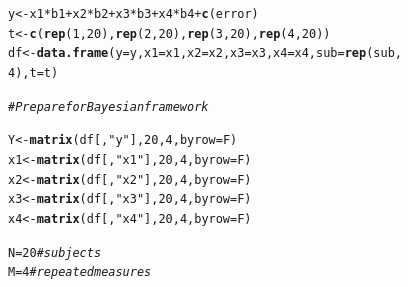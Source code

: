 \documentclass[11pt,a4paper,twoside]{book}\usepackage[]{graphicx}\usepackage[]{color}
\makeatletter
\newcommand{\hlnum}[1]{\textcolor[rgb]{0.686,0.059,0.569}{#1}}%
\newcommand{\hlstr}[1]{\textcolor[rgb]{0.192,0.494,0.8}{#1}}%
\newcommand{\hlcom}[1]{\textcolor[rgb]{0.678,0.584,0.686}{\textit{#1}}}%
\newcommand{\hlopt}[1]{\textcolor[rgb]{0,0,0}{#1}}%
\newcommand{\hlstd}[1]{\textcolor[rgb]{0.345,0.345,0.345}{#1}}%
\newcommand{\hlkwb}[1]{\textcolor[rgb]{0.69,0.353,0.396}{#1}}%
\newcommand{\hlkwc}[1]{\textcolor[rgb]{0.333,0.667,0.333}{#1}}%
\newcommand{\hlkwd}[1]{\textcolor[rgb]{0.737,0.353,0.396}{\textbf{#1}}}%
\newenvironment{kframe}{%
 \def\at@end@of@kframe{}%
 \ifinner\ifhmode%
  \def\at@end@of@kframe{\end{minipage}}%
  \begin{minipage}{\columnwidth}%
 \fi\fi%
 \def\FrameCommand##1{\hskip\@totalleftmargin \hskip-\fboxsep
 \colorbox{shadecolor}{##1}\hskip-\fboxsep
     \hskip-\linewidth \hskip-\@totalleftmargin \hskip\columnwidth}%
 \MakeFramed {\advance\hsize-\width
   \@totalleftmargin\z@ \linewidth\hsize
   \@setminipage}}%
 {\par\unskip\endMakeFramed%
 \at@end@of@kframe}
\newenvironment{knitrout}{}{} %
\makeatother
\begin{document}
\begin{codeenv}
\begin{knitrout}
\begin{kframe}
\begin{alltt}
\hlstd{y} \hlkwb{<-} \hlstd{x1} \hlopt{*} \hlstd{b1} \hlopt{+} \hlstd{x2} \hlopt{*} \hlstd{b2} \hlopt{+} \hlstd{x3} \hlopt{*} \hlstd{b3} \hlopt{+} \hlstd{x4} \hlopt{*} \hlstd{b4} \hlopt{+} \hlkwd{c}\hlstd{(error)}
\hlstd{t} \hlkwb{<-} \hlkwd{c}\hlstd{(}\hlkwd{rep}\hlstd{(}\hlnum{1}\hlstd{,} \hlnum{20}\hlstd{),} \hlkwd{rep}\hlstd{(}\hlnum{2}\hlstd{,} \hlnum{20}\hlstd{),} \hlkwd{rep}\hlstd{(}\hlnum{3}\hlstd{,} \hlnum{20}\hlstd{),} \hlkwd{rep}\hlstd{(}\hlnum{4}\hlstd{,} \hlnum{20}\hlstd{))}
\hlstd{df} \hlkwb{<-} \hlkwd{data.frame}\hlstd{(}\hlkwc{y} \hlstd{= y,} \hlkwc{x1} \hlstd{= x1,} \hlkwc{x2} \hlstd{= x2,} \hlkwc{x3} \hlstd{= x3,} \hlkwc{x4} \hlstd{= x4,} \hlkwc{sub} \hlstd{=} \hlkwd{rep}\hlstd{(sub,}
    \hlnum{4}\hlstd{),} \hlkwc{t} \hlstd{= t)}

\hlcom{# Prepare for Bayesian framework}

\hlstd{Y} \hlkwb{<-} \hlkwd{matrix}\hlstd{(df[,} \hlstr{"y"}\hlstd{],} \hlnum{20}\hlstd{,} \hlnum{4}\hlstd{,} \hlkwc{byrow} \hlstd{= F)}
\hlstd{x1} \hlkwb{<-} \hlkwd{matrix}\hlstd{(df[,} \hlstr{"x1"}\hlstd{],} \hlnum{20}\hlstd{,} \hlnum{4}\hlstd{,} \hlkwc{byrow} \hlstd{= F)}
\hlstd{x2} \hlkwb{<-} \hlkwd{matrix}\hlstd{(df[,} \hlstr{"x2"}\hlstd{],} \hlnum{20}\hlstd{,} \hlnum{4}\hlstd{,} \hlkwc{byrow} \hlstd{= F)}
\hlstd{x3} \hlkwb{<-} \hlkwd{matrix}\hlstd{(df[,} \hlstr{"x3"}\hlstd{],} \hlnum{20}\hlstd{,} \hlnum{4}\hlstd{,} \hlkwc{byrow} \hlstd{= F)}
\hlstd{x4} \hlkwb{<-} \hlkwd{matrix}\hlstd{(df[,} \hlstr{"x4"}\hlstd{],} \hlnum{20}\hlstd{,} \hlnum{4}\hlstd{,} \hlkwc{byrow} \hlstd{= F)}

\hlstd{N} \hlkwb{=} \hlnum{20}  \hlcom{#subjects}
\hlstd{M} \hlkwb{=} \hlnum{4}  \hlcom{# repeated measures}
\end{alltt}
\end{kframe}
\end{knitrout}
	\end{codeenv}
	
		\vspace{15mm}
\end{document}
